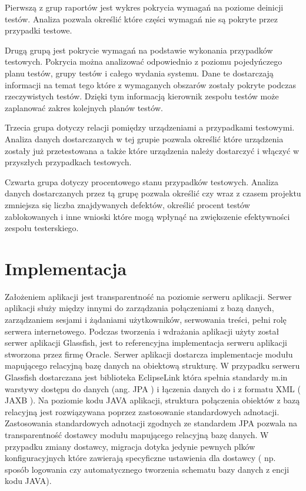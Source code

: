 Pierwszą z grup raportów jest wykres pokrycia wymagań na poziome deinicji testów. Analiza pozwala określić które części wymagań nie są pokryte przez przypadki testowe.

Drugą grupą jest pokrycie wymagań na podstawie wykonania przypadków testowych. Pokrycia można analizować odpowiednio z poziomu pojedyńczego planu testów, grupy testów i całego wydania systemu. Dane te dostarczają informacji na temat tego które z wymaganych obszarów zostały pokryte podczas rzeczywistych testów. Dzięki tym informacją kierownik zespołu testów może zaplanować zakres kolejnych planów testów.

Trzecia grupa dotyczy relacji pomiędzy urządzeniami a przypadkami testowymi. Analiza danych dostarczanych w tej grupie pozwala określić które urządzenia zostały już przetestowana a także które urządzenia należy dostarczyć i włączyć w przyszłych przypadkach testowych.

Czwarta grupa dotyczy procentowego stanu przypadków testowych. Analiza danych dostarczanych przez tą grupę pozwala określić czy wraz z czasem projektu zmniejsza się liczba znajdywanych defektów, określić procent testów zablokowanych i inne wnioski które mogą wpłynąć na zwiększenie efektywności zespołu testerskiego.



\chapter{Implementacja}

Założeniem aplikacji jest transparentność na poziomie serweru aplikacji. Serwer aplikacji służy między innymi do zarządzania połączeniami z bazą danych, zarządzaniem sesjami i żądaniami użytkowników, serwowania treści, pełni rolę serwera internetowego. Podczas tworzenia i wdrażania aplikacji użyty został serwer aplikacji Glassfish, jest to referencyjna implementacja serweru aplikacji stworzona przez firmę Oracle. Serwer aplikacji dostarcza implementacje modułu mapującego relacyjną bazę danych na obiektową strukturę. W przypadku serweru Glassfish dostarczana jest biblioteka EclipseLink która spełnia standardy m.in warstywy dostępu do danych (ang. JPA ) i łączenia danych do i z formatu XML ( JAXB ). Na poziomie kodu JAVA aplikacji, struktura połączenia obiektów z bazą relacyjną jest rozwiązywana poprzez zastosowanie standardowych adnotacji. Zastosowania standardowych adnotacji zgodnych ze standardem JPA pozwala na transparentność dostawcy modułu mapującego relacyjną bazę danych. W przypadku zmiany dostawcy, migracja dotyka jedynie pewnych plków konfiguracyjnych które zawierają specyficzne ustawienia dla dostawcy ( np. sposób logowania czy automatycznego tworzenia schematu bazy danych z encji kodu JAVA).

